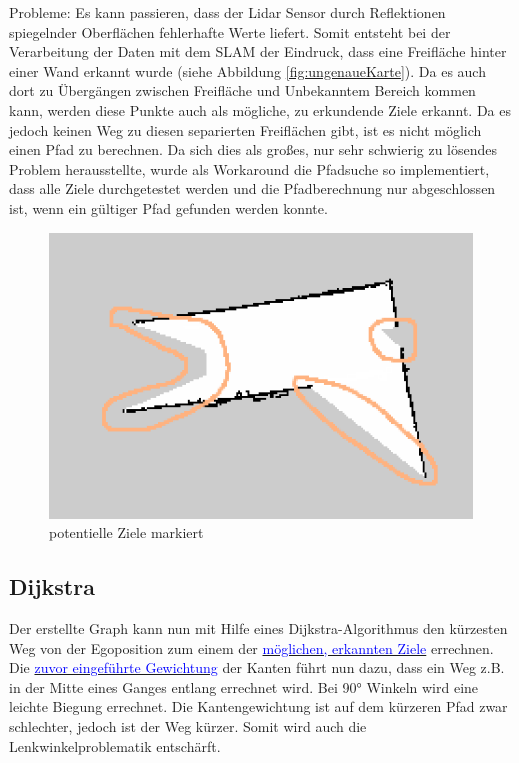 Probleme:
Es kann passieren, dass der Lidar Sensor durch Reflektionen spiegelnder Oberflächen fehlerhafte Werte liefert. Somit entsteht bei der Verarbeitung der Daten mit dem SLAM der Eindruck, dass eine Freifläche hinter einer Wand erkannt wurde (siehe Abbildung \ref{fig:ungenaueKarte}). Da es auch dort zu Übergängen zwischen Freifläche und Unbekanntem Bereich kommen kann, werden diese Punkte auch als mögliche, zu erkundende Ziele erkannt. Da es jedoch keinen Weg zu diesen separierten Freiflächen gibt, ist es nicht möglich einen Pfad zu berechnen. Da sich dies als großes, nur sehr schwierig zu lösendes Problem herausstellte, wurde als Workaround die Pfadsuche so implementiert, dass alle Ziele durchgetestet werden und die Pfadberechnung nur abgeschlossen ist, wenn ein gültiger Pfad gefunden werden konnte.


\begin{figure}[h]
\begin{center}
\includegraphics[width=15cm]{images/chapter5/MapUebergaenge_Markiert.png}
\caption{potentielle Ziele markiert}
\label{Map_aus_Graph}
\end{center}
\end{figure}



\subsection{Dijkstra}


Der erstellte Graph kann nun mit Hilfe eines Dijkstra-Algorithmus den kürzesten Weg von der Egoposition zum einem der 
\hyperref[sec:ziele]{\textcolor{blue}{möglichen, erkannten Ziele}} errechnen. Die \hyperref[sec:gewichtung]{\textcolor{blue}{zuvor eingeführte Gewichtung}} der Kanten führt nun dazu, dass ein Weg z.B. in der Mitte eines Ganges entlang errechnet wird. Bei 90° Winkeln wird eine leichte Biegung errechnet. Die Kantengewichtung ist auf dem kürzeren Pfad zwar schlechter, jedoch ist der Weg kürzer. Somit wird auch die Lenkwinkelproblematik entschärft. 

